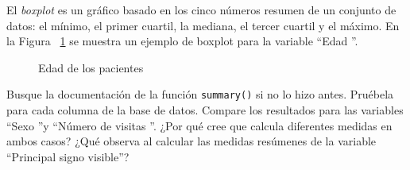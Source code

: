 \documentclass{prob}
\begin{document}
	\begin{problema}
	El \textit{boxplot} es un gráfico basado en los cinco números resumen de un conjunto de datos: el mínimo, el primer cuartil, la mediana, el tercer cuartil y el máximo. En la Figura ~\ref{fig:boxplot} se muestra un ejemplo de boxplot para la variable \textquotedblleft Edad \textquotedblright .

\begin{figure}[!ht]
    \centering
    
    \caption{Edad de los pacientes}
    \label{fig:boxplot}
\end{figure}	

	\begin{parte}
	Busque la documentación de la función \texttt{summary()} si no lo hizo antes. Pruébela para cada columna de la base de datos. Compare los resultados para las variables \textquotedblleft Sexo \textquotedblright y \textquotedblleft Número de visitas \textquotedblright . ¿Por qué cree que calcula diferentes medidas en ambos casos? ¿Qué observa al calcular las medidas resúmenes de la variable \textquotedblleft Principal signo visible\textquotedblright ?\\
	
		\noindent{}\\
	
	\end{parte}	
	

\end{problema}
\end{document}
